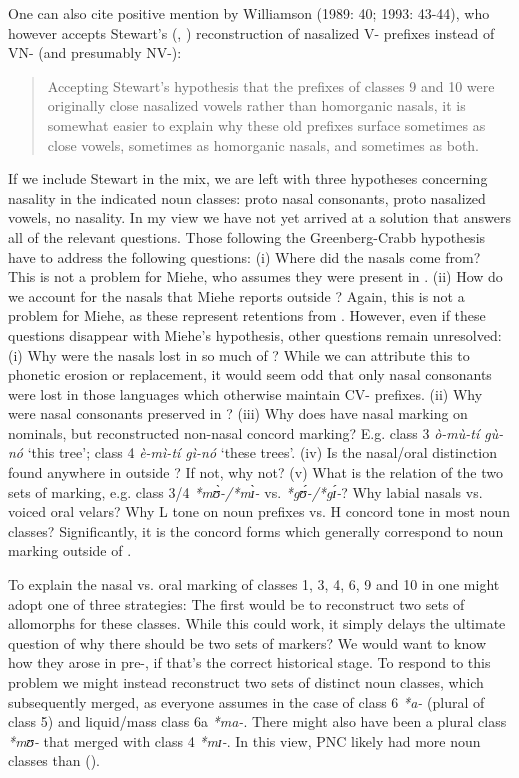 \documentclass[output=paper]{langsci/langscibook}
\begin{document}
One can also cite positive mention by Williamson (1989: 40; 1993: 43-44), who however accepts Stewart’s (\citeyear{Stewart1999nasal}, \citeyear*{Stewart1999explanation,Stewart2002})  reconstruction of nasalized V- prefixes instead of VN- (and presumably NV-):

\begin{quote}
Accepting Stewart’s hypothesis that the prefixes of classes 9 and 10 were originally close nasalized vowels rather than homorganic nasals, it is somewhat easier to explain why these old prefixes surface sometimes as close vowels, sometimes as homorganic nasals, and sometimes as both. \citep[44]{Williamson1993}
\end{quote}

If we include Stewart in the mix, we are left with three hypotheses concerning nasality in the indicated noun classes: proto nasal consonants, proto nasalized vowels, no nasality. In my view we have not yet arrived at a solution that answers all of the relevant questions. Those following the Greenberg-Crabb hypothesis have to address the following questions: (i) Where did the  nasals come from? This is not a problem for Miehe, who assumes they were present in . (ii) How do we account for the nasals that Miehe reports outside ? Again, this is not a problem for Miehe, as these represent retentions from . However, even if these questions disappear with Miehe’s hypothesis, other questions remain unresolved: (i) Why were the nasals lost in so much of ? While we can attribute this to phonetic erosion or replacement, it would seem odd that only nasal consonants were lost in those  languages which otherwise maintain CV- prefixes. (ii) Why were nasal consonants preserved in ? (iii) Why does  have nasal marking on nominals, but reconstructed non-nasal concord marking? E.g.  class 3 \textit{ò-mù-tí gù-nó} ‘this tree’; class 4 \textit{è-mì-tí gì-nó} ‘these trees’. (iv) Is the nasal/oral distinction found anywhere in  outside ? If not, why not? (v) What is the relation of the two sets of marking, e.g. class 3/4 \textit{*mʊ̀-/*mɪ̀-} vs. \textit{*gʊ́-/*gɪ́-}? Why labial nasals vs. voiced oral velars? Why L tone on noun prefixes vs. H concord tone in most noun classes? Significantly, it is the concord forms which generally correspond to noun marking outside of .

To explain the nasal vs. oral marking of classes 1, 3, 4, 6, 9 and 10 in  one might adopt one of three strategies: The first would be to reconstruct two sets of  allomorphs for these classes. While this could work, it simply delays the ultimate question of why there should be two sets of markers? We would want to know how they arose in pre-, if that’s the correct historical stage. To respond to this problem we might instead reconstruct two sets of distinct noun classes, which subsequently merged, as everyone assumes in the case of class 6 \textit{*a-} (plural of class 5) and liquid/mass class 6a \textit{*ma-}. There might also have been a plural class \textit{*mʊ-} that merged with class 4 \textit{*mɪ-}. In this view, PNC likely had more noun classes than  ().
\end{document}
